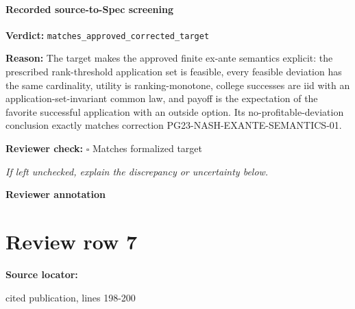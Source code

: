 \documentclass[10pt]{article}
\newcommand{\reviewerbox}{%
  \par\noindent\fbox{\parbox{0.96\linewidth}{\rule{0pt}{0.38in}}}\par
}
\newcommand{\reviewmatch}[1]{%
  \par\noindent\textbf{Reviewer check:} $\square$\; #1\par
  \noindent\emph{If left unchecked, explain the discrepancy or uncertainty below.}\par
}
\begin{document}
\paragraph{Recorded source-to-Spec screening}
\textbf{Verdict:} \texttt{matches\_approved\_corrected\_target}
\\
{\raggedright
\textbf{Reason:} The target makes the approved finite ex-\allowbreak{}ante semantics explicit:\allowbreak{} the prescribed rank-\allowbreak{}threshold application set is feasible, every feasible deviation has the same cardinality, utility is ranking-\allowbreak{}monotone, college successes are iid with an application-\allowbreak{}set-\allowbreak{}invariant common law, and payoff is the expectation of the favorite successful application with an outside option.\allowbreak{} Its no-\allowbreak{}profitable-\allowbreak{}deviation conclusion exactly matches correction PG23-\allowbreak{}NASH-\allowbreak{}EXANTE-\allowbreak{}SEMANTICS-\allowbreak{}01.\allowbreak{}
\par}
\reviewmatch{Matches formalized target}
\noindent\textbf{Reviewer annotation}\par
\reviewerbox
\clearpage
\hypertarget{source-claim-47c2916d7eec1ab6}{}
\section*{Review row 7}
\textbf{Source locator:} {\footnotesize\raggedright cited publication, lines 198-\allowbreak{}200\par}
\end{document}
